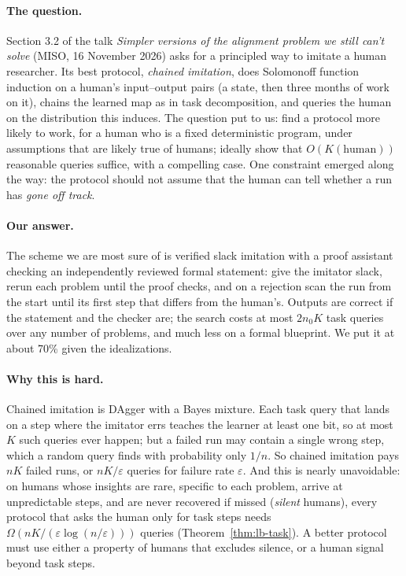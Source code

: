 \documentclass[11pt]{article}
\theoremstyle{definition}
\theoremstyle{remark}
\newcommand{\K}{K}
\begin{document}
\paragraph{The question.} Section 3.2 of the talk \emph{Simpler versions of the alignment problem we still can't solve} (MISO, 16 November 2026) asks for a principled way to imitate a human researcher. Its best protocol, \emph{chained imitation}, does Solomonoff function induction on a human's input--output pairs (a state, then three months of work on it), chains the learned map as in task decomposition, and queries the human on the distribution this induces. The question put to us: find a protocol more likely to work, for a human who is a fixed deterministic program, under assumptions that are likely true of humans; ideally show that $O(\K(\text{human}))$ reasonable queries suffice, with a compelling case. One constraint emerged along the way: the protocol should not assume that the human can tell whether a run has \emph{gone off track}.

\paragraph{Our answer.} The scheme we are most sure of is verified slack imitation with a proof assistant checking an independently reviewed formal statement: give the imitator slack, rerun each problem until the proof checks, and on a rejection scan the run from the start until its first step that differs from the human's. Outputs are correct if the statement and the checker are; the search costs at most $2n_0\K$ task queries over any number of problems, and much less on a formal blueprint. We put it at about 70\% given the idealizations.

\paragraph{Why this is hard.} Chained imitation is DAgger \cite{ross} with a Bayes mixture. Each task query that lands on a step where the imitator errs teaches the learner at least one bit, so at most $\K$ such queries ever happen; but a failed run may contain a single wrong step, which a random query finds with probability only $1/n$. So chained imitation pays $n\K$ failed runs, or $n\K/\varepsilon$ queries for failure rate $\varepsilon$. And this is nearly unavoidable: on humans whose insights are rare, specific to each problem, arrive at unpredictable steps, and are never recovered if missed (\emph{silent} humans), every protocol that asks the human only for task steps needs $\Omega(n\K/(\varepsilon\log(n/\varepsilon)))$ queries (Theorem~\ref{thm:lb-task}). A better protocol must use either a property of humans that excludes silence, or a human signal beyond task steps.
\end{document}
